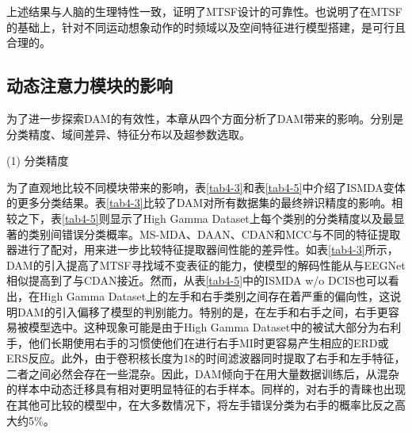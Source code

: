 上述结果与人脑的生理特性\cite{4-24}一致，证明了MTSF设计的可靠性。也说明了在MTSF的基础上，针对不同运动想象动作的时频域以及空间特征进行模型搭建，是可行且合理的。


\subsection{动态注意力模块的影响}
为了进一步探索DAM的有效性，本章从四个方面分析了DAM带来的影响。分别是分类精度、域间差异、特征分布以及超参数选取。

(1) 分类精度

为了直观地比较不同模块带来的影响，表\ref{tab4-3}和表\ref{tab4-5}中介绍了ISMDA变体的更多分类结果。表\ref{tab4-3}比较了DAM对所有数据集的最终辨识精度的影响。相较之下，表\ref{tab4-5}则显示了High Gamma Dataset上每个类别的分类精度以及最显著的类别间错误分类概率。MS-MDA、DAAN、CDAN和MCC与不同的特征提取器进行了配对，用来进一步比较特征提取器间性能的差异性。如表\ref{tab4-3}所示，DAM的引入提高了MTSF寻找域不变表征的能力，使模型的解码性能从与EEGNet相似提高到了与CDAN接近。然而，从表\ref{tab4-5}中的ISMDA w/o DCIS也可以看出，在High Gamma Dataset上的左手和右手类别之间存在着严重的偏向性，这说明DAM的引入偏移了模型的判别能力。特别的是，在左手和右手之间，右手更容易被模型选中。这种现象可能是由于High Gamma Dataset中的被试大部分为右利手，他们长期使用右手的习惯使他们在进行右手MI时更容易产生相应的ERD或ERS反应。此外，由于卷积核长度为18的时间滤波器同时提取了右手和左手特征，二者之间必然会存在一些混杂。因此，DAM倾向于在用大量数据训练后，从混杂的样本中动态迁移具有相对更明显特征的右手样本。同样的，对右手的青睐也出现在其他可比较的模型中，在大多数情况下，将左手错误分类为右手的概率比反之高大约5\%。
